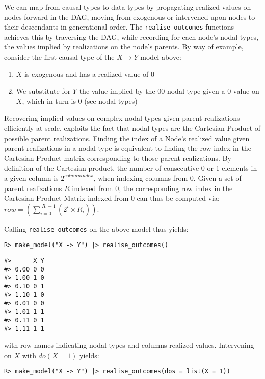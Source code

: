 \documentclass[
  11pt,
  article]{jss}
\providecommand{\tightlist}{%
  \setlength{\itemsep}{0pt}\setlength{\parskip}{0pt}}\usepackage{longtable,booktabs,array}
\begin{document}
We can map from causal types to data types by propagating realized
values on nodes forward in the DAG, moving from exogenous or intervened
upon nodes to their descendants in generational order. The
\texttt{realise\_outcomes} functions achieves this by traversing the
DAG, while recording for each node's nodal types, the values implied by
realizations on the node's parents. By way of example, consider the
first causal type of the \(X \rightarrow Y\) model above:

\begin{enumerate}
\def\labelenumi{\arabic{enumi}.}
\tightlist
\item
  \(X\) is exogenous and has a realized value of \(0\)
\item
  We substitute for \(Y\) the value implied by the \(00\) nodal type
  given a \(0\) value on \(X\), which in turn is \(0\) (see nodal types)
\end{enumerate}

Recovering implied values on complex nodal types given parent
realizations efficiently at scale, exploits the fact that nodal types
are the Cartesian Product of possible parent realizations. Finding the
index of a Node's realized value given parent realizations in a nodal
type is equivalent to finding the row index in the Cartesian Product
matrix corresponding to those parent realizations. By definition of the
Cartesian product, the number of consecutive 0 or 1 elements in a given
column is \(2^{columnindex}\), when indexing columns from 0. Given a set
of parent realizations \(R\) indexed from 0, the corresponding row index
in the Cartesian Product Matrix indexed from 0 can thus be computed via:
\(row = (\sum_{i = 0}^{|R| - 1} (2^{i} \times R_i))\).

Calling \texttt{realise\_outcomes} on the above model thus yields:

\begin{verbatim}
R> make_model("X -> Y") |> realise_outcomes()
\end{verbatim}

\begin{verbatim}
#>      X Y
#> 0.00 0 0
#> 1.00 1 0
#> 0.10 0 1
#> 1.10 1 0
#> 0.01 0 0
#> 1.01 1 1
#> 0.11 0 1
#> 1.11 1 1
\end{verbatim}

with row names indicating nodal types and columns realized values.
Intervening on \(X\) with \(do(X=1)\) yields:

\begin{verbatim}
R> make_model("X -> Y") |> realise_outcomes(dos = list(X = 1))
\end{verbatim}
\end{document}
